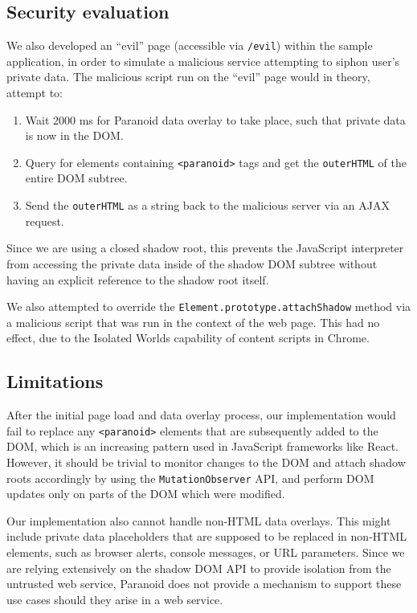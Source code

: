 \documentclass[letterpaper,twocolumn,10pt]{article}
\begin{document}
\subsection{Security evaluation}

We also developed an ``evil'' page (accessible via \texttt{/evil}) within the sample application, in order to simulate a malicious service attempting to siphon user's private data. The malicious script run on the ``evil'' page would in theory, attempt to:

\begin{enumerate}
    \item Wait 2000 ms for Paranoid data overlay to take place, such that private data is now in the DOM.
    \item Query for elements containing \texttt{<paranoid>} tags and get the \texttt{outerHTML} of the entire DOM subtree.
    \item Send the \texttt{outerHTML} as a string back to the malicious server via an AJAX request.
\end{enumerate}

Since we are using a closed shadow root, this prevents the JavaScript interpreter from accessing the private data inside of the shadow DOM subtree without having an explicit reference to the shadow root itself.

We also attempted to override the \texttt{Element.prototype.attachShadow} method via a malicious script that was run in the context of the web page. This had no effect, due to the Isolated Worlds capability of content scripts in Chrome.

\subsection{Limitations}

After the initial page load and data overlay process, our implementation would fail to replace any \texttt{<paranoid>} elements that are subsequently added to the DOM, which is an increasing pattern used in JavaScript frameworks like React. However, it should be trivial to monitor changes to the DOM and attach shadow roots accordingly by using the \texttt{MutationObserver} API, and perform DOM updates only on parts of the DOM which were modified.

Our implementation also cannot handle non-HTML data overlays. This might include private data placeholders that are supposed to be replaced in non-HTML elements, such as browser alerts, console messages, or URL parameters. Since we are relying extensively on the shadow DOM API to provide isolation from the untrusted web service, Paranoid does not provide a mechanism to support these use cases should they arise in a web service.
\end{document}
